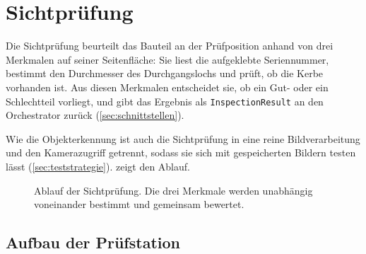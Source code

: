 \chapter{Sichtprüfung}
\label{ch:sichtpruefung}

Die Sichtprüfung beurteilt das Bauteil an der Prüfposition anhand von drei Merkmalen auf
seiner Seitenfläche: Sie liest die aufgeklebte Seriennummer, bestimmt den Durchmesser des
Durchgangslochs und prüft, ob die Kerbe vorhanden ist. Aus diesen Merkmalen entscheidet sie,
ob ein Gut- oder ein Schlechtteil vorliegt, und gibt das Ergebnis als
\texttt{InspectionResult} an den Orchestrator zurück (\cref{sec:schnittstellen}).

Wie die Objekterkennung ist auch die Sichtprüfung in eine reine Bildverarbeitung und den
Kamerazugriff getrennt, sodass sie sich mit gespeicherten Bildern testen lässt
(\cref{sec:teststrategie}).  zeigt den Ablauf.

\begin{figure}[htbp]
  \centering
  \caption{Ablauf der Sichtprüfung. Die drei Merkmale werden unabhängig voneinander bestimmt
           und gemeinsam bewertet.}
  \label{fig:m3-kette}
\end{figure}

\section{Aufbau der Prüfstation}
\label{sec:m3-aufbau}

